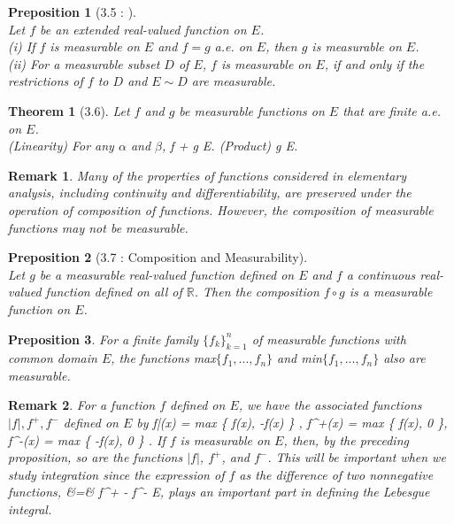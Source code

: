 \documentclass{article} %
\def\eQb#1\eQe{\begin{eqnarray*}#1\end{eqnarray*}}
\theoremstyle{quest}
\newtheorem*{theorem}{Theorem}
\newtheorem*{preposition}{Preposition}
\newtheorem*{remark}{Remark}
\begin{document}
\bigskip

\begin{preposition}[3.5 : ] ~\\
Let $f$ be an extended real-valued function on $E$. \\
\textit{(i)} If $f$ is measurable on $E$ and $f = g$ a.e. on $E$, then $g$ is 
measurable on $E$. \\
\textit{(ii)} For a measurable subset $D$ of $E$, $f$ is measurable on $E$, if and only if
the restrictions of $f$ to $D$ and $E \sim D$ are measurable.
\end{preposition}

\bigskip

\begin{theorem}[3.6]
Let $f$ and $g$ be measurable functions on $E$ that are finite a.e. on $E$. \\
\textit{(Linearity)} For any $\alpha$ and $\beta$,
\eQb
\alpha f + \beta g \> \>  E.
\eQe
\textit{(Product)} 
\eQb
fg \> \>  E.
\eQe
\end{theorem}

\bigskip

\begin{remark}
Many of the properties of functions considered in elementary analysis, including continuity and 
differentiability, are preserved under the operation of composition of functions. However,
the composition of measurable functions may not be measurable.
\end{remark}

\bigskip

\begin{preposition}[3.7 : Composition and Measurability] ~\\
Let $g$ be a measurable real-valued function defined on $E$ and $f$ a continuous
real-valued function defined on all of $\mathbb{R}$. Then the composition $f \circ g$ is a 
measurable function on $E$.
\end{preposition}

\bigskip

\begin{preposition}
For a finite family $\{ f_k \}_{k=1}^{n}$ of measurable functions with common domain $E$,
the functions max$\{ f_1 , ..., f_n \}$ and min$\{ f_1 , ..., f_n \}$ also are measurable.
\end{preposition}

\bigskip

\begin{remark}
For a function $f$ defined on $E$, we have the associated functions $|f|, f^{+}, f^{-}$ defined
on $E$ by 
\eQb
|f|(x) = max \{ f(x), -f(x) \} , f^{+}(x) = max \{ f(x), 0 \}, f^{-}(x) = max \{ -f(x), 0 \} .
\eQe
If $f$ is measurable on $E$, then, by the preceding proposition, so are the functions $|f|$, 
$f^{+}$, and $f^{-}$. This will be important when we study integration since the expression of $f$
as the difference of two nonnegative functions,
\eQb
f &=& f^{+} - f^{-} \>  E,
\eQe
plays an important part in defining the Lebesgue integral.
\end{remark}
\end{document}
